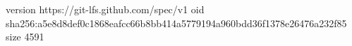 version https://git-lfs.github.com/spec/v1
oid sha256:a5e8d8def0c1868eafcc66b8bb414a5779194a960bdd36f1378e26476a232f85
size 4591

